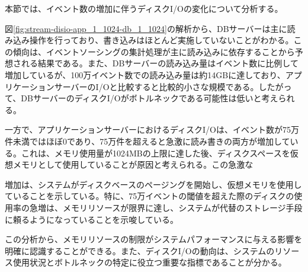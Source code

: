 \documentclass[../../../../../main]{subfiles}
\begin{document}
    \label{subsubsubsec:result-streaming-only-limit-diskio}

    本節では、イベント数の増加に伴うディスクI/Oの変化について分析する。

    

    図\ref{fig:stream-disio-app_1_1024-db_1_1024}の解析から、DBサーバーは主に読み込み操作を行っており、書き込みはほとんど実施していないことがわかる。この傾向は、イベントソーシングの集計処理が主に読み込みに依存することから予想される結果である。また、DBサーバーの読み込み量はイベント数に比例して増加しているが、100万イベント数での読み込み量は約14GBに達しており、アプリケーションサーバーのI/Oと比較すると比較的小さな規模である。したがって、DBサーバーのディスクI/Oがボトルネックである可能性は低いと考えられる。

    一方で、アプリケーションサーバーにおけるディスクI/Oは、イベント数が75万件未満ではほぼ0であり、75万件を超えると急激に読み書きの両方が増加している。これは、メモリ使用量が1024MBの上限に達した後、ディスクスペースを仮想メモリとして使用していることが原因と考えられる。この急激な

    増加は、システムがディスクベースのページングを開始し、仮想メモリを使用していることを示している。特に、75万イベントの閾値を超えた際のディスクの使用率の急増は、メモリリソースが限界に達し、システムが代替のストレージ手段に頼るようになっていることを示唆している。

    この分析から、メモリリソースの制限がシステムパフォーマンスに与える影響を明確に認識することができる。また、ディスクI/Oの動向は、システムのリソース使用状況とボトルネックの特定に役立つ重要な指標であることが分かる。
\end{document}
